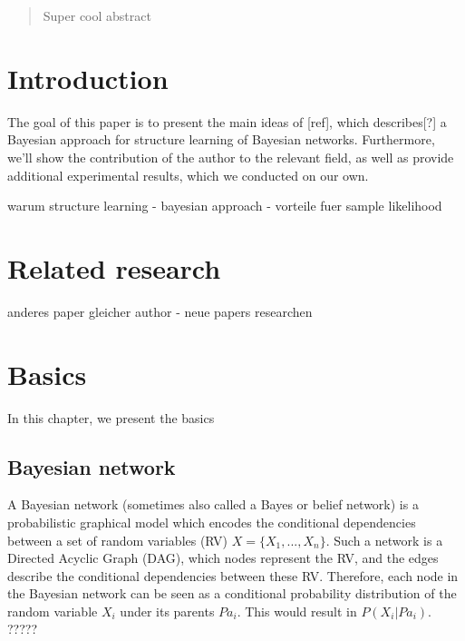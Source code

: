 \documentclass{article}
\begin{document}
 


\begin{abstract} 
Super cool abstract
\end{abstract} 


\section{Introduction}
The goal of this paper is to present the main ideas of [ref], which describes[?] a Bayesian approach
for structure learning of Bayesian networks. Furthermore, we'll show the contribution of the author to
the relevant field, as well as provide additional experimental results, which we conducted on our own.

warum structure learning - bayesian approach - vorteile fuer sample likelihood

\section{Related research}
anderes paper gleicher author - neue papers researchen

\section{Basics}
In this chapter, we present the basics

	\subsection{Bayesian network}
	A Bayesian network (sometimes also called a Bayes or belief network) is a probabilistic graphical model
	which encodes the conditional dependencies between a set of random variables (RV) $X=\{X_1,..., X_n\}$.
	Such a network	is a Directed Acyclic Graph (DAG), which nodes represent the RV, and the edges 
	describe the conditional
	dependencies between these RV. Therefore, each node in the Bayesian network can be seen as a 
	conditional probability distribution of the random variable $X_i$ under its parents $Pa_i$.
	This would result in $P(X_i|Pa_i)$. ?????
	
\end{document}
